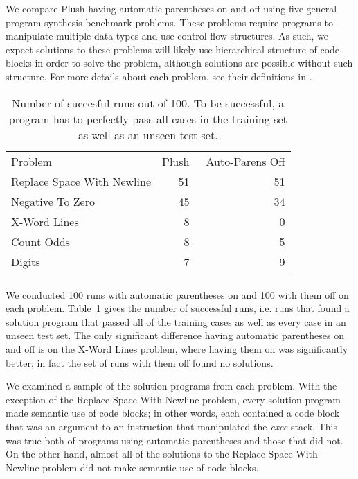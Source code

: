 We compare Plush having automatic parentheses on and off using five general program synthesis benchmark problems. These problems require programs to manipulate multiple data types and use control flow structures. As such, we expect solutions to these problems will likely use hierarchical structure of code blocks in order to solve the problem, although solutions are possible without such structure. For more details about each problem, see their definitions in \cite{Helmuth:2015:GECCO}.

\begin{table}[t]
\centering
\caption{
Number of succesful runs out of 100. To be successful, a program has to perfectly pass all cases in the training set as well as an unseen test set.
}
\label{no-auto-parens-experiment}       %
%
%
\begin{tabular}{l r r}
\hline\noalign{\smallskip}
Problem                    & Plush & ~Auto-Parens Off \\
\noalign{\smallskip}\svhline\noalign{\smallskip}
Replace Space With Newline &  51 & 51 \\
Negative To Zero           &  45 & 34 \\
X-Word Lines               &   8 &  0 \\
Count Odds                 &   8 &  5 \\
Digits                     &   7 &  9 \\
\noalign{\smallskip}\hline\noalign{\smallskip}
\end{tabular}
\end{table}

We conducted 100 runs with automatic parentheses on and 100 with them off on each problem. Table~\ref{no-auto-parens-experiment} gives the number of successful runs, i.e. runs that found a solution program that passed all of the training cases as well as every case in an unseen test set. The only significant difference having automatic parentheses on and off is on the X-Word Lines problem, where having them on was significantly better; in fact the set of runs with them off found no solutions.

We examined a sample of the solution programs from each problem. With the exception of the Replace Space With Newline problem, every solution program made semantic use of code blocks; in other words, each contained a code block that was an argument to an instruction that manipulated the \textit{exec} stack. This was true both of programs using automatic parentheses and those that did not. On the other hand, almost all of the solutions to the Replace Space With Newline problem did not make semantic use of code blocks.


